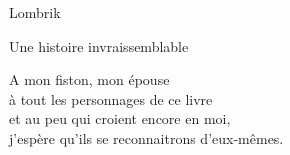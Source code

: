 \documentclass[10pt,b5paper]{report}
\author{Drunken Kiwi}
\begin{document}
\Fontlukas

\begin{titlepage}
    \vspace*{\fill}
	\begin{center}
	\begin{Huge}
	Lombrik
	\end{Huge}

	Une histoire invraissemblable
	\end{center}
	\vspace*{\fill}
\end{titlepage}

\vspace*{\fill}
\begin{flushright}

A mon fiston, mon épouse \\à tout les personnages de ce livre \\ et au peu qui croient encore en moi,\\ j'espère qu'ils se reconnaitrons d'eux-mêmes.
\end{flushright}






\tableofcontents
\end{document}
